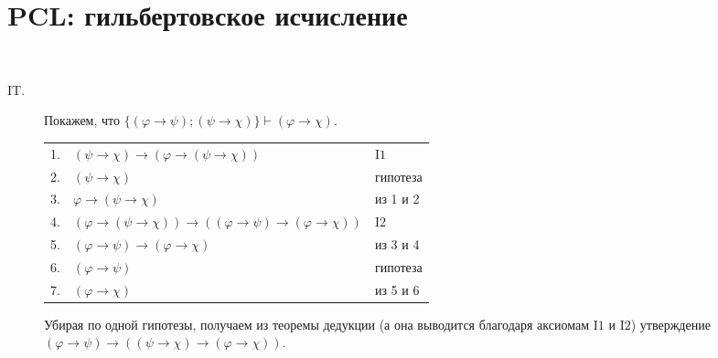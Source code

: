 \documentclass[12pt,a4paper]{article}
\newcommand{\reset}{\setcounter{enumprb}{0}}
\begin{document}
    \section{PCL: гильбертовское исчисление}\reset

    \begin{enumproblem}\ 
        \begin{description}
            \item[$\mathrm{IT}$.] Покажем, что $\{(\varphi \rightarrow \psi); (\psi \rightarrow \chi)\} \vdash (\varphi \rightarrow \chi)$.
                \begin{center}
                    \begin{tabular}{rll}
                        1.& $(\psi \rightarrow \chi) \rightarrow (\varphi \rightarrow (\psi \rightarrow \chi))$& $\mathrm{I1}$\\
                        2.& $(\psi \rightarrow \chi)$& гипотеза\\
                        3.& $\varphi \rightarrow (\psi \rightarrow \chi)$& из 1 и 2\\
                        4.& $(\varphi \rightarrow (\psi \rightarrow \chi)) \rightarrow ((\varphi \rightarrow \psi) \rightarrow (\varphi \rightarrow \chi))$& $\mathrm{I2}$\\
                        5.& $(\varphi \rightarrow \psi) \rightarrow (\varphi \rightarrow \chi)$& из 3 и 4\\
                        6.& $(\varphi \rightarrow \psi)$& гипотеза\\
                        7.& $(\varphi \rightarrow \chi)$& из 5 и 6\\
                    \end{tabular}
                \end{center}
                Убирая по одной гипотезы, получаем из теоремы дедукции (а она выводится благодаря аксиомам $\mathrm{I1}$ и $\mathrm{I2}$) утверждение $(\varphi \rightarrow \psi) \rightarrow ((\psi \rightarrow \chi) \rightarrow (\varphi \rightarrow \chi))$.


\end{description}
\end{enumproblem}
\end{document}
